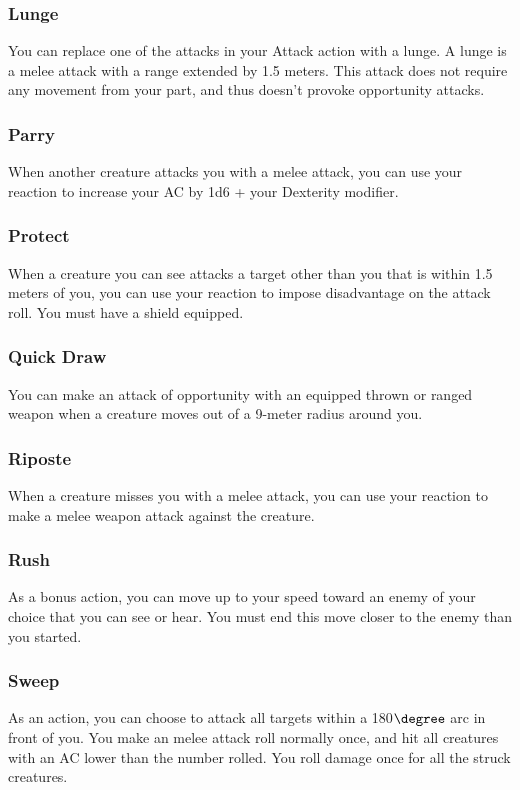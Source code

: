 \subsubsection{Lunge} \label{tec::lunge}
You can replace one of the attacks in your Attack action with a lunge.
A lunge is a melee attack with a range extended by 1.5 meters.
This attack does not require any movement from your part, and thus doesn't provoke opportunity attacks.

\subsubsection{Parry} \label{tec::parry}
When another creature attacks you with a melee attack, you can use your reaction to increase your AC by 1d6 + your Dexterity modifier.

\subsubsection{Protect} \label{tec::protect}
When a creature you can see attacks a target other than you that is within 1.5 meters of you, you can use your reaction to impose disadvantage on the attack roll.
You must have a shield equipped.

\subsubsection{Quick Draw} \label{tec::quickdraw}
You can make an attack of opportunity with an equipped thrown or ranged weapon when a creature moves out of a 9-meter radius around you.

\subsubsection{Riposte} \label{tec::riposte}
When a creature misses you with a melee attack, you can use your reaction to make a melee weapon attack against the creature.

\subsubsection{Rush} \label{tec::rush}
As a bonus action, you can move up to your speed toward an enemy of your choice that you can see or hear.
You must end this move closer to the enemy than you started.

\subsubsection{Sweep} \label{tec::sweep}
As an action, you can choose to attack all targets within a 180$\degree$ arc in front of you.
You make an melee attack roll normally once, and hit all creatures with an AC lower than the number rolled.
You roll damage once for all the struck creatures.

